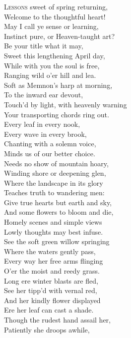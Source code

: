 \textsc{Lessons} sweet of spring returning, \\
 Welcome to the thoughtful heart! \\
 May I call ye sense or learning, \\
 Instinct pure, or Heaven-taught art? \\
 Be your title what it may, \\
 Sweet this lengthening April day, \\
 While with you the soul is free, \\
 Ranging wild o’er hill and lea. \\
  Soft as Memnon’s harp at morning, \\
 To the inward ear devout, \\
 Touch’d by light, with heavenly warning \\
 Your transporting chords ring out. \\
 Every leaf in every nook, \\
 Every wave in every brook, \\
 Chanting with a solemn voice, \\
 Minds us of our better choice. \\
  Needs no show of mountain hoary, \\
 Winding shore or deepening glen, \\
 Where the landscape in its glory \\
 Teaches truth to wandering men: \\
 Give true hearts but earth and sky, \\
 And some flowers to bloom and die, \\
 Homely scenes and simple views \\
 Lowly thoughts may best infuse. \\
  See the soft green willow springing \\
 Where the waters gently pass, \\
 Every way her free arms flinging \\
 O’er the moist and reedy grass. \\
 Long ere winter blasts are fled, \\
 See her tipp’d with vernal red, \\
 And her kindly flower displayed \\
 Ere her leaf can cast a shade. \\
  Though the rudest hand assail her, \\
 Patiently she droops awhile, \\
